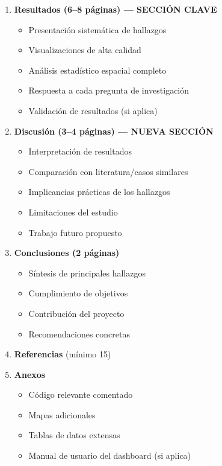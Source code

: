 \documentclass[11pt,a4paper]{article}
\begin{document}
\begin{enumerate}[leftmargin=*]
\begin{itemize}[leftmargin=*]
  \item Procesamiento aplicado (con justificación)
  \item Diagrama de flujo metodológico completo
  \item Métodos de análisis espacial empleados
  \item Herramientas y librerías utilizadas
  \item Limitaciones metodológicas
  \end{itemize}
\item \textbf{Resultados (6--8 páginas) --- SECCIÓN CLAVE}
  \begin{itemize}[leftmargin=*]
  \item Presentación sistemática de hallazgos
  \item Visualizaciones de alta calidad
  \item Análisis estadístico espacial completo
  \item Respuesta a cada pregunta de investigación
  \item Validación de resultados (si aplica)
  \end{itemize}
\item \textbf{Discusión (3--4 páginas) --- NUEVA SECCIÓN}
  \begin{itemize}[leftmargin=*]
  \item Interpretación de resultados
  \item Comparación con literatura/casos similares
  \item Implicancias prácticas de los hallazgos
  \item Limitaciones del estudio
  \item Trabajo futuro propuesto
  \end{itemize}
\item \textbf{Conclusiones (2 páginas)}
  \begin{itemize}[leftmargin=*]
  \item Síntesis de principales hallazgos
  \item Cumplimiento de objetivos
  \item Contribución del proyecto
  \item Recomendaciones concretas
  \end{itemize}
\item \textbf{Referencias} (mínimo 15)
\item \textbf{Anexos}
  \begin{itemize}[leftmargin=*]
  \item Código relevante comentado
  \item Mapas adicionales
  \item Tablas de datos extensas
  \item Manual de usuario del dashboard (si aplica)
  \end{itemize}
\end{enumerate}
\end{document}
